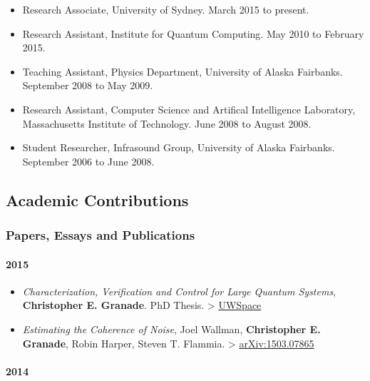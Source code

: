 \documentclass[]{article}
\begin{document}
\begin{itemize}
\itemsep1pt\parskip0pt
\item
  Research Associate, University of Sydney. March 2015 to present.
\item
  Research Assistant, Institute for Quantum Computing. May 2010 to
  February 2015.
\item
  Teaching Assistant, Physics Department, University of Alaska
  Fairbanks. September 2008 to May 2009.
\item
  Research Assistant, Computer Science and Artifical Intelligence
  Laboratory, Massachusetts Institute of Technology. June 2008 to August
  2008.
\item
  Student Researcher, Infrasound Group, University of Alaska Fairbanks.
  September 2006 to June 2008.
\end{itemize}

\subsection{Academic Contributions}\label{academic-contributions}

\subsubsection{Papers, Essays and
Publications}\label{papers-essays-and-publications}

\paragraph{2015}\label{section}

\begin{itemize}
\item
  \emph{Characterization, Veriﬁcation and Control for Large Quantum
  Systems}, \textbf{Christopher E. Granade}. PhD Thesis. \textgreater{}
  \href{https://uwspace.uwaterloo.ca/handle/10012/9217}{UWSpace}
\item
  \emph{Estimating the Coherence of Noise}, Joel Wallman,
  \textbf{Christopher E. Granade}, Robin Harper, Steven T. Flammia.
  \textgreater{}
  \href{https://scirate.com/arxiv/1503.07865}{arXiv:1503.07865}
\end{itemize}

\paragraph{2014}\label{section-1}
\end{document}
